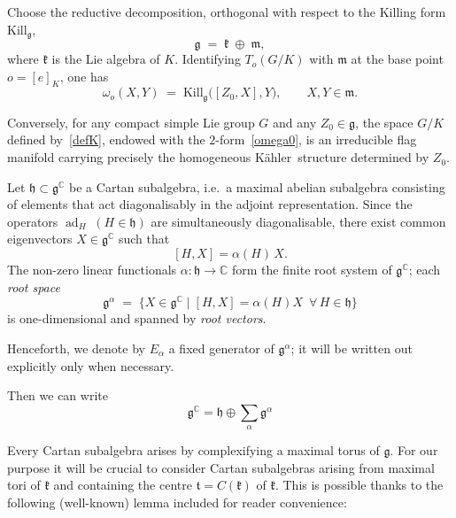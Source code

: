 \documentclass[reqno]{amsart}
\newcommand{\C}{\mathds{C}}
\newcommand{\K}{K\"{a}hler}
\newcommand{\Kill}{{\mathrm{Kill}}}
\newcommand{\ad}{\operatorname{ad}}
\begin{document}
Choose the reductive decomposition, orthogonal with respect to the Killing form~\(\Kill_{\mathfrak{g}}\),
\begin{equation}\label{reductive}
   \mathfrak{g} \;=\; \mathfrak{k} \;\oplus\; \mathfrak{m},
\end{equation}
where $\mathfrak{k}$ is the Lie algebra of $K$.
Identifying \(T_o(G/K)\) with \(\mathfrak{m}\) at the base point \(o=[e]_K\), one has
\begin{equation}\label{omega0}
   \omega_o(X,Y)
   \;=\;
   \Kill_{\mathfrak{g}}\!\bigl([Z_0,X],Y\bigr),
   \qquad X,Y\in\mathfrak{m}.
\end{equation}

Conversely, for any compact simple Lie group \(G\) and any \(Z_0\in\mathfrak{g}\), the space \(G/K\) defined by~\eqref{defK}, endowed with the \(2\)-form~\eqref{omega0}, is an irreducible flag manifold carrying precisely the homogeneous \K\ structure determined by \(Z_0\).

Let \(\mathfrak{h}\subset\mathfrak{g}^{\C}\) be a Cartan subalgebra, i.e.\ a maximal abelian subalgebra consisting of elements that act diagonalisably in the adjoint representation.  Since the operators \(\ad_H\;(H\in\mathfrak{h})\) are simultaneously diagonalisable, there exist common eigenvectors \(X\in\mathfrak{g}^{\C}\) such that
\[
   [H,X]=\alpha(H)\,X.
\]
The non-zero linear functionals \(\alpha:\mathfrak{h}\to\C\) form the finite root system of \(\mathfrak{g}^{\C}\); each \emph{root space}
\[
   \mathfrak{g}^{\alpha}
   \;=\;
   \bigl\{X\in\mathfrak{g}^{\C}\mid[H,X]=\alpha(H)X\;\ \forall\,H\in\mathfrak{h}\bigr\}
\]
is one-dimensional and spanned by \emph{root vectors}.


Henceforth, we denote by \(E_\alpha\) a fixed generator of \(\mathfrak{g}^\alpha\); it will be written out explicitly only when necessary.

Then we can write
\begin{equation}\label{ghgalpha}
\mathfrak{g}^{\C}=\mathfrak{h}\oplus \sum_{\alpha} \mathfrak{g}^{\alpha}
\end{equation}

Every Cartan subalgebra arises by complexifying a maximal torus of \(\mathfrak{g}\).
For our purpose it will be crucial to consider Cartan subalgebras arising from maximal tori of $\mathfrak{k}$
and containing  the centre \(\mathfrak{t}=C(\mathfrak{k})\) of \(\mathfrak{k}\). This is possible thanks to the following (well-known) lemma included for reader convenience:
\end{document}
